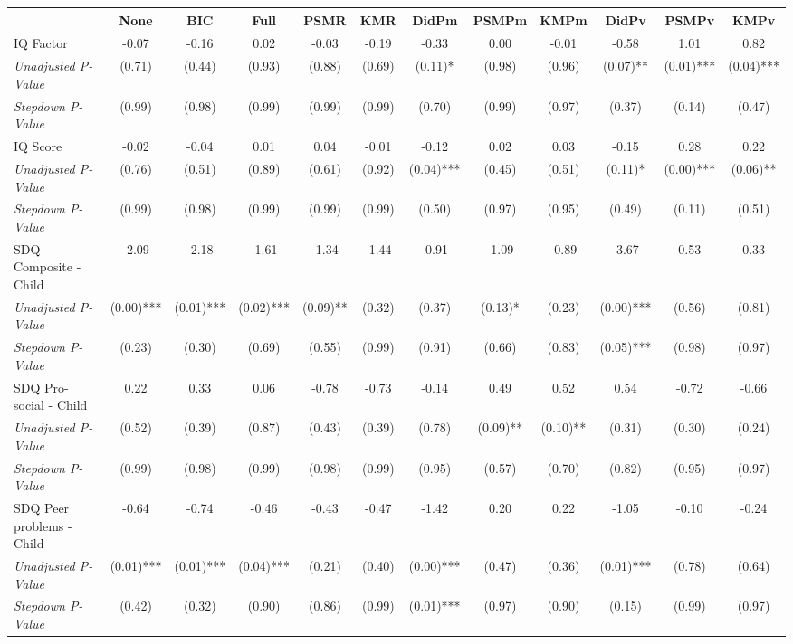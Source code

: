 \begin{tabular}{l c c c c c c c c c c c}
\toprule
 & None & BIC & Full & PSMR & KMR & DidPm & PSMPm & KMPm & DidPv & PSMPv & KMPv \\
\midrule
IQ Factor & -0.07 & -0.16 & 0.02 & -0.03 & -0.19 & -0.33 & 0.00 & -0.01 & -0.58 & 1.01 & 0.82 \\
\quad \textit{Unadjusted P-Value} & (0.71) & (0.44) & (0.93) & (0.88) & (0.69) & (0.11)* & (0.98) & (0.96) & (0.07)** & (0.01)*** & (0.04)*** \\
\quad \textit{Stepdown P-Value} & (0.99) & (0.98) & (0.99) & (0.99) & (0.99) & (0.70) & (0.99) & (0.97) & (0.37) & (0.14) & (0.47) \\
IQ Score & -0.02 & -0.04 & 0.01 & 0.04 & -0.01 & -0.12 & 0.02 & 0.03 & -0.15 & 0.28 & 0.22 \\
\quad \textit{Unadjusted P-Value} & (0.76) & (0.51) & (0.89) & (0.61) & (0.92) & (0.04)*** & (0.45) & (0.51) & (0.11)* & (0.00)*** & (0.06)** \\
\quad \textit{Stepdown P-Value} & (0.99) & (0.98) & (0.99) & (0.99) & (0.99) & (0.50) & (0.97) & (0.95) & (0.49) & (0.11) & (0.51) \\
SDQ Composite - Child & -2.09 & -2.18 & -1.61 & -1.34 & -1.44 & -0.91 & -1.09 & -0.89 & -3.67 & 0.53 & 0.33 \\
\quad \textit{Unadjusted P-Value} & (0.00)*** & (0.01)*** & (0.02)*** & (0.09)** & (0.32) & (0.37) & (0.13)* & (0.23) & (0.00)*** & (0.56) & (0.81) \\
\quad \textit{Stepdown P-Value} & (0.23) & (0.30) & (0.69) & (0.55) & (0.99) & (0.91) & (0.66) & (0.83) & (0.05)*** & (0.98) & (0.97) \\
SDQ Pro-social - Child & 0.22 & 0.33 & 0.06 & -0.78 & -0.73 & -0.14 & 0.49 & 0.52 & 0.54 & -0.72 & -0.66 \\
\quad \textit{Unadjusted P-Value} & (0.52) & (0.39) & (0.87) & (0.43) & (0.39) & (0.78) & (0.09)** & (0.10)** & (0.31) & (0.30) & (0.24) \\
\quad \textit{Stepdown P-Value} & (0.99) & (0.98) & (0.99) & (0.98) & (0.99) & (0.95) & (0.57) & (0.70) & (0.82) & (0.95) & (0.97) \\
SDQ Peer problems - Child & -0.64 & -0.74 & -0.46 & -0.43 & -0.47 & -1.42 & 0.20 & 0.22 & -1.05 & -0.10 & -0.24 \\
\quad \textit{Unadjusted P-Value} & (0.01)*** & (0.01)*** & (0.04)*** & (0.21) & (0.40) & (0.00)*** & (0.47) & (0.36) & (0.01)*** & (0.78) & (0.64) \\
\quad \textit{Stepdown P-Value} & (0.42) & (0.32) & (0.90) & (0.86) & (0.99) & (0.01)*** & (0.97) & (0.90) & (0.15) & (0.99) & (0.97) \\

\end{tabular}
